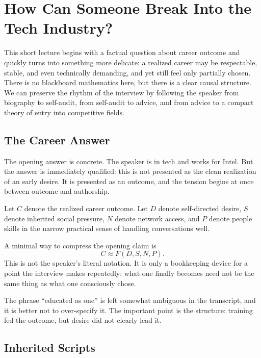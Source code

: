 \chapter{How Can Someone Break Into the Tech Industry?}

This short lecture begins with a factual question about career outcome and quickly turns into something more delicate: a realized career may be respectable, stable, and even technically demanding, and yet still feel only partially chosen. There is no blackboard mathematics here, but there is a clear causal structure. We can preserve the rhythm of the interview by following the speaker from biography to self-audit, from self-audit to advice, and from advice to a compact theory of entry into competitive fields.

\section{The Career Answer}

The opening answer is concrete. The speaker is in tech and works for Intel. But the answer is immediately qualified: this is not presented as the clean realization of an early desire. It is presented as an outcome, and the tension begins at once between outcome and authorship.

\begin{definition}
Let \(C\) denote the realized career outcome. Let \(D\) denote self-directed desire, \(S\) denote inherited social pressure, \(N\) denote network access, and \(P\) denote people skills in the narrow practical sense of handling conversations well.
\end{definition}

A minimal way to compress the opening claim is
\begin{equation}
C \approx F(D,S,N,P).
\end{equation}
This is not the speaker's literal notation. It is only a bookkeeping device for a point the interview makes repeatedly: what one finally becomes need not be the same thing as what one consciously chose.

The phrase ``educated as one'' is left somewhat ambiguous in the transcript, and it is better not to over-specify it. The important point is the structure: training fed the outcome, but desire did not clearly lead it.

\section{Inherited Scripts}

